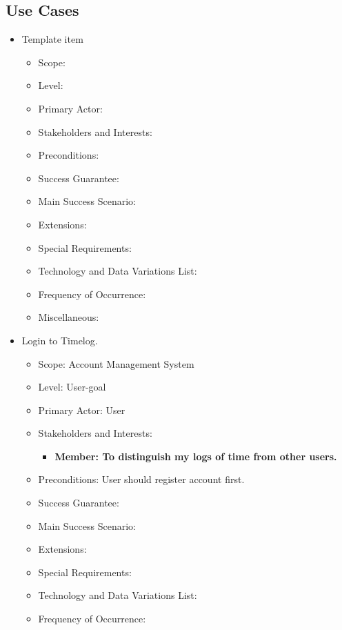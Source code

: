 \documentclass[12pt, a4paper]{article}
\begin{document}
\begin{CJK*}{UTF8}{bkai}
  \subsection{Use Cases}
    \begin{itemize}
      \item {{Template item}}
        \begin{itemize}
          \item Scope:
          \item Level:
          \item Primary Actor:
          \item Stakeholders and Interests:
          \item Preconditions:
          \item Success Guarantee:
          \item Main Success Scenario:
          \item Extensions:
          \item Special Requirements:
          \item Technology and Data Variations List:
          \item Frequency of Occurrence:
          \item Miscellaneous:
        \end{itemize}
      \item Login to Timelog.
        \begin{itemize}
          \item Scope: Account Management System
          \item Level: User-goal
          \item Primary Actor: User
          \item Stakeholders and Interests:
            \begin{itemize}
              \item \bf{Member}: To distinguish my logs of time from other users.
            \end{itemize}
          \item Preconditions: User should register account first.
          \item Success Guarantee:
          \item Main Success Scenario:
          \item Extensions:
          \item Special Requirements:
          \item Technology and Data Variations List:
          \item Frequency of Occurrence:

\end{itemize}
\end{itemize}
\end{CJK*}
\end{document}
